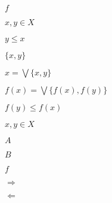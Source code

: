 \documentclass[10pt]{book}
\begin{document}
\begin{mdSnippets}
\begin{mdInlineSnippet}%
$f$\end{mdInlineSnippet}%
\begin{mdInlineSnippet}%
$x, y \in X$\end{mdInlineSnippet}%
\begin{mdInlineSnippet}%
$y \leq x$\end{mdInlineSnippet}%
\begin{mdInlineSnippet}%
$\{x, y\}$\end{mdInlineSnippet}%
\begin{mdInlineSnippet}[86a6e3d4a5ee23d6309e94dbc5f93c73]%
$x = \bigvee \{x, y\}$\end{mdInlineSnippet}%
\begin{mdInlineSnippet}[32e500d1c3a37d530dc149ecf3d854ac]%
$f(x) = \bigvee \{f(x), f(y)\}$\end{mdInlineSnippet}%
\begin{mdInlineSnippet}[6d05b51c3ef946b7c9fcb42bd3fe8804]%
$f(y) \leq f(x)$\end{mdInlineSnippet}%
\begin{mdInlineSnippet}%
$x, y \in X$\end{mdInlineSnippet}%
\begin{mdInlineSnippet}[7fc56270e7a70fa81a5935b72eacbe29]%
$A$\end{mdInlineSnippet}%
\begin{mdInlineSnippet}%
$B$\end{mdInlineSnippet}%
\begin{mdInlineSnippet}%
$f$\end{mdInlineSnippet}%
\begin{mdInlineSnippet}[055889aaee38b7c53f994c5e42a40994]%
$\Rightarrow$\end{mdInlineSnippet}%
\begin{mdInlineSnippet}[d61f64f8313343fe74cc321a6ec6d88f]%
$\Leftarrow$\end{mdInlineSnippet}%

\end{mdSnippets}
\end{document}

